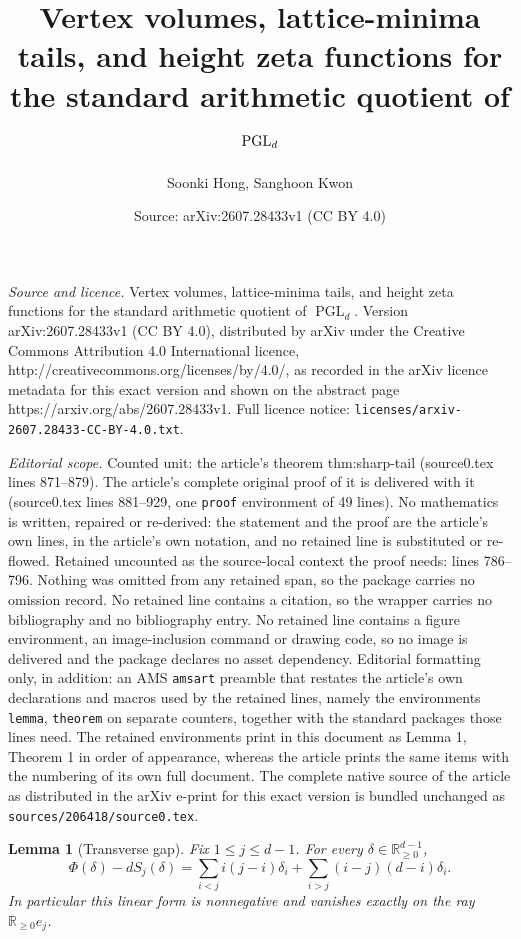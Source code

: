 \documentclass[10pt,a4paper]{amsart}
\title{Vertex volumes, lattice-minima tails, and height zeta functions for the standard arithmetic quotient of $\PGL_d$}
\author{Soonki Hong, Sanghoon Kwon}
\date{Source: arXiv:2607.28433v1 (CC BY 4.0)}
\newcommand{\PGL}{\operatorname{PGL}}
\newtheorem{lemma}{Lemma}
\newcommand{\RR}{\mathbb R}
\begin{document}
\maketitle

\noindent\emph{Source and licence.} Vertex volumes, lattice-minima tails, and height zeta functions for the standard arithmetic quotient of $\PGL_d$. Version arXiv:2607.28433v1 (CC BY 4.0), distributed by arXiv under the Creative Commons Attribution 4.0 International licence, http://creativecommons.org/licenses/by/4.0/, as recorded in the arXiv licence metadata for this exact version and shown on the abstract page https://arxiv.org/abs/2607.28433v1. Full licence notice: \texttt{licenses/arxiv-2607.28433-CC-BY-4.0.txt}.\par\smallskip

\noindent\textit{Editorial scope.} Counted unit: the article's theorem thm:sharp-tail (source0.tex lines 871--879). The article's complete original proof of it is delivered with it (source0.tex lines 881--929, one \texttt{proof} environment of 49 lines). No mathematics is written, repaired or re-derived: the statement and the proof are the article's own lines, in the article's own notation, and no retained line is substituted or re-flowed.  Retained uncounted as the source-local context the proof needs: lines 786--796.  Nothing was omitted from any retained span, so the package carries no omission record.  No retained line contains a citation, so the wrapper carries no bibliography and no bibliography entry.  No retained line contains a figure environment, an image-inclusion command or drawing code, so no image is delivered and the package declares no asset dependency.  Editorial formatting only, in addition: an AMS \texttt{amsart} preamble that restates the article's own declarations and macros used by the retained lines, namely the environments \texttt{lemma}, \texttt{theorem} on separate counters, together with the standard packages those lines need.  The retained environments print in this document as Lemma 1, Theorem 1 in order of appearance, whereas the article prints the same items with the numbering of its own full document.  The complete native source of the article as distributed in the arXiv e-print for this exact version is bundled unchanged as \texttt{sources/206418/source0.tex}.
\begin{lemma}[Transverse gap]\label{lem:transverse-gap}
Fix $1\le j\le d-1$.  For every $\delta\in\RR_{\ge0}^{d-1}$,
\begin{equation}\label{eq:Rj-formula}
  \Phi(\delta)-dS_j(\delta)
  =
  \sum_{i<j}i(j-i)\delta_i+
  \sum_{i>j}(i-j)(d-i)\delta_i.
\end{equation}
In particular this linear form is nonnegative and vanishes exactly on the ray
$\RR_{\ge0}e_j$.
\end{lemma}
\end{document}
